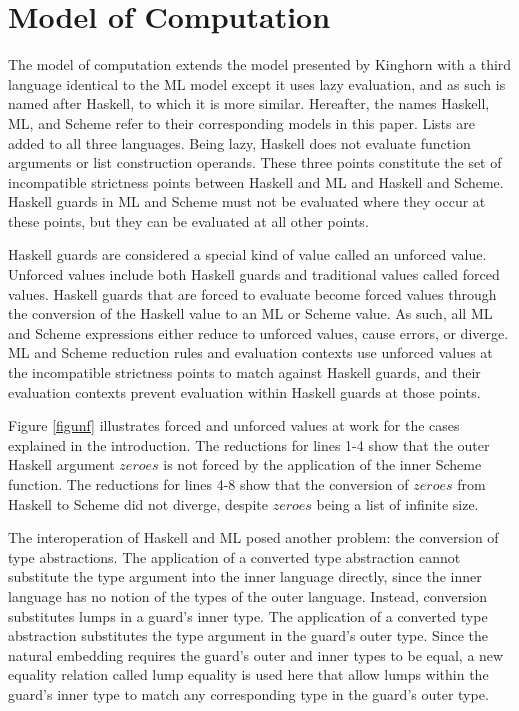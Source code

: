 \section{Model of Computation}

The model of computation extends the model presented by Kinghorn \cite{kinghorn07} with a third language identical to the ML model except it uses lazy evaluation, and as such is named after Haskell, to which it is more similar. Hereafter, the names Haskell, ML, and Scheme refer to their corresponding models in this paper. Lists are added to all three languages. Being lazy, Haskell does not evaluate function arguments or list construction operands. These three points constitute the set of incompatible strictness points between Haskell and ML and Haskell and Scheme. Haskell guards in ML and Scheme must not be evaluated where they occur at these points, but they can be evaluated at all other points.

Haskell guards are considered a special kind of value called an unforced value. Unforced values include both Haskell guards and traditional values called forced values. Haskell guards that are forced to evaluate become forced values through the conversion of the Haskell value to an ML or Scheme value. As such, all ML and Scheme expressions either reduce to unforced values, cause errors, or diverge. ML and Scheme reduction rules and evaluation contexts use unforced values at the incompatible strictness points to match against Haskell guards, and their evaluation contexts prevent evaluation within Haskell guards at those points.

Figure \ref{figunf} illustrates forced and unforced values at work for the cases explained in the introduction. The reductions for lines 1-4 show that the outer Haskell argument $zeroes$ is not forced by the application of the inner Scheme function. The reductions for lines 4-8 show that the conversion of $zeroes$ from Haskell to Scheme did not diverge, despite $zeroes$ being a list of infinite size.



The interoperation of Haskell and ML posed another problem: the conversion of type abstractions. The application of a converted type abstraction cannot substitute the type argument into the inner language directly, since the inner language has no notion of the types of the outer language. Instead, conversion substitutes lumps in a guard's inner type. The application of a converted type abstraction substitutes the type argument in the guard's outer type. Since the natural embedding \cite{matthews07} requires the guard's outer and inner types to be equal, a new equality relation called lump equality is used here that allow lumps within the guard's inner type to match any corresponding type in the guard's outer type.

